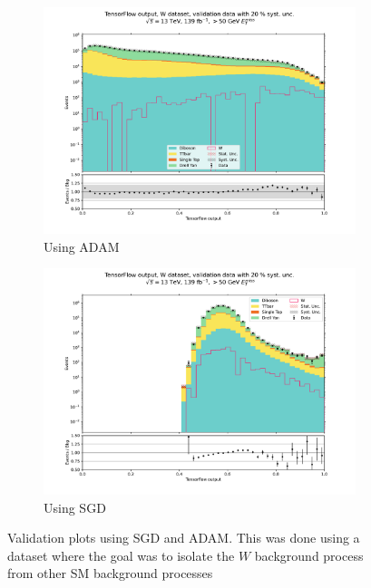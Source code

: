 \documentclass[12pt, a4paper]{book}
\begin{document}
\begin{figure}[!ht]
	\centering
      \begin{subfigure}[b]{0.49\textwidth}
         \centering
         \includegraphics[width=1\textwidth]{Balanced/VAL.pdf}
         \caption{Using ADAM}
      \end{subfigure}
      \begin{subfigure}[b]{0.49\textwidth}
         \centering
         \includegraphics[width=1\textwidth]{SGD/Balanced/VAL.pdf}
         \caption{Using SGD}
      \end{subfigure}
      \caption[Difference between ADAM and SGD optimizer]{Validation plots using SGD and ADAM. 
      This was done using a dataset where the goal was to isolate the $W$ background process from other SM background processes}\label{fig:ADAMvsSGD}
\end{figure}
\end{document}
